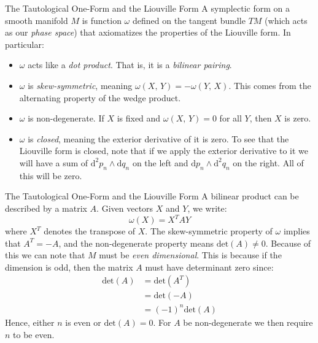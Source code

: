 \documentclass{beamer}
\begin{document}
    \begin{frame}{The Tautological One-Form and the Liouville Form}
        A symplectic form on a smooth manifold $M$ is function
        $\omega$ defined on the
        tangent bundle $TM$ (which acts as our \textit{phase space})
        that axiomatizes the properties of the Liouville form. In particular:
        \begin{itemize}
            \item
                $\omega$ acts like a \textit{dot product}. That is, it is a
                \textit{bilinear pairing}.
            \item
                $\omega$ is \textit{skew-symmetric}, meaning
                $\omega(X,\,Y)=-\omega(Y,\,X)$. This comes from the alternating
                property of the wedge product.
            \item
                $\omega$ is non-degenerate. If $X$ is fixed and
                $\omega(X,\,Y)=0$ for all $Y$, then $X$ is zero.
            \item
                $\omega$ is \textit{closed}, meaning the exterior derivative
                of it is zero. To see that the Liouville form is closed,
                note that if we apply the exterior derivative to it we will
                have a sum of $\textrm{d}^{2}p_{n}\land\textrm{d}q_{n}$ on the
                left and $\textrm{d}p_{n}\land\textrm{d}^{2}q_{n}$ on the
                right. All of this will be zero.
        \end{itemize}
    \end{frame}
    \begin{frame}{The Tautological One-Form and the Liouville Form}
        A bilinear product can be described by a matrix $A$. Given vectors
        $X$ and $Y$, we write:
        \[
            \omega(X)=X^{T}AY
        \]
        where $X^{T}$ denotes the transpose of $X$. The skew-symmetric property
        of $\omega$ implies that $A^{T}=-A$, and the non-degenerate property
        means $\textrm{det}(A)\ne{0}$. Because of this we can note that
        $M$ must be \textit{even dimensional}. This is because if the dimension
        is odd, then the matrix $A$ must have determinant zero since:
        \[
            \begin{aligned}
                \textrm{det}(A)
                &=\textrm{det}(A^{T})\\
                &=\textrm{det}(-A)\\
                &=(-1)^{n}\textrm{det}(A)
            \end{aligned}
        \]
        Hence, either $n$ is even or $\textrm{det}(A)=0$. For $A$ be
        non-degenerate we then require $n$ to be even.
    \end{frame}
\end{document}
